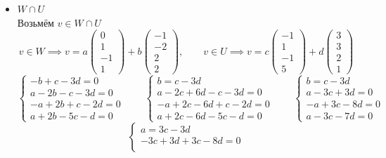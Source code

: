 \begin{itemize}
	\item $ W \cap U $ \\
    Возьмём $ v \in W \cap U $
    $$ v \in W \implies v = a
    \begin{pmatrix}
    	0 \\
        1 \\
        -1 \\
        1
    \end{pmatrix} + b
    \begin{pmatrix}
    	-1 \\
        -2 \\
        2 \\
        2
    \end{pmatrix}, \qquad v \in U \implies v = c
    \begin{pmatrix}
    	-1 \\
        1 \\
        -1 \\
        5
    \end{pmatrix} + d
    \begin{pmatrix}
    	3 \\
        3 \\
        2 \\
        1
    \end{pmatrix} $$
    $$
    \begin{cases}
    	-b + c - 3d = 0 \\
        a - 2b - c - 3d = 0 \\
        -a + 2b + c - 2d = 0 \\
        a + 2b - 5c - d = 0
    \end{cases} \qquad
    \begin{cases}
    	b = c - 3d \\
        a - 2c + 6d - c - 3d = 0 \\
        -a + 2c - 6d + c - 2d = 0 \\
        a + 2c - 6d - 5c - d = 0
    \end{cases} \qquad
    \begin{cases}
    	b = c - 3d \\
        a - 3c + 3d = 0 \\
        -a + 3c - 8d = 0 \\
        a - 3c - 7d = 0
    \end{cases} $$
    $$
    \begin{cases}
    	a = 3c - 3d \\
        -3c + 3d + 3c - 8d = 0 \\

\end{cases}$$
\end{itemize}

